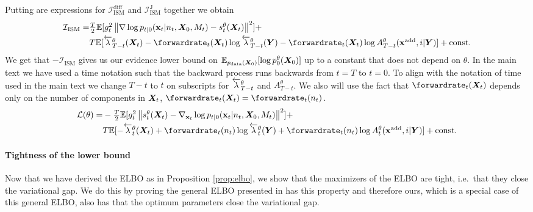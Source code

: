 Putting are expressions for $\mathcal{I}_{\text{ISM}}^{\text{diff}}$ and $\mathcal{I}_{\text{ISM}}^{\text{J}}$ together we obtain
\begin{align}
    \mathcal{I}_{\text{ISM}} = &\textstyle \frac{T}{2} \mathbb{E} [g_t^2 \norm{\nabla \log p_{t|0}(\rvx_t | n_t, \mX_0, M_t) - s_t^\theta(\mX_t)}^2 ] + \\
    &\textstyle T\mathbb{E} [ \backwardrate_{T-t}^\theta(\mX_t) - \forwardrate_t(\mX_t) \log \backwardrate_{T-t}^\theta(\mY) - \forwardrate_t(\mX_t) \log A_{T-t}^\theta(\xadd, i | \mY) ] + \text{const} . 
\end{align}
We get that $-\mathcal{I}_{\text{ISM}}$ gives us our evidence lower bound on
$\mathbb{E}_{p_{\rm{data}}({\bm{X}}_0)} [ \log p_0^\theta({\bm{X}}_0) ]$ up to a constant that does
not depend on $\theta$. In the main text we have used a time notation such that
the backward process runs backwards from $t=T$ to $t=0$. To align with the
notation of time used in the main text we change $T-t$ to $t$ on subscripts for
$\overleftarrow{\lambda}_{T-t}^\theta$ and $A_{T-t}^\theta$. We also will use the fact
that $\forwardrate_t(\mX_t)$ depends only on the number of components in ${\bm{X}}_t$,
$\forwardrate_t(\mX_t) = \forwardrate_t(n_t)$.
\begin{align}
    \mathcal{L}(\theta) = &\textstyle  -\frac{T}{2} \mathbb{E} [g_t^2 \norm{ s_t^\theta(\mX_t) - \nabla_{\rvx_t} \log p_{t|0}(\rvx_t | n_t, \mX_0, M_t)}^2 ] + \\
    &\textstyle T\mathbb{E} [ - \backwardrate_{t}^\theta(\mX_t) + \forwardrate_t(n_t) \log \backwardrate_{t}^\theta(\mY) + \forwardrate_t(n_t) \log A_{t}^\theta(\xadd, i | \mY) ] + \text{const} . 
\end{align}




\paragraph{Tightness of the lower bound}
\label{sec:tddm-tightness-}
Now that we have derived the ELBO as in Proposition \ref{prop:elbo}, we show that the maximizers of the ELBO are tight, i.e.~that they close the variational
gap. We do this by proving the general ELBO presented in \cite{benton2022denoising} has this property and therefore ours, which is a special case of this general ELBO, also has that the optimum parameters close the variational gap.


